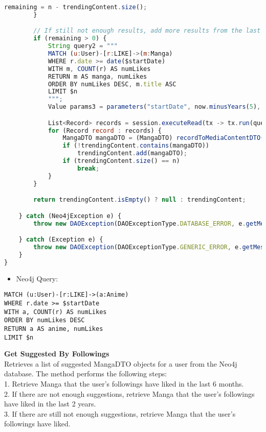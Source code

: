 \begin{lstlisting}[language=JavaScript]
            remaining = n - trendingContent.size();
        }

        // If still not enough results, add more results from the last 5 years
        if (remaining > 0) {
            String query2 = """
            MATCH (u:User)-[r:LIKE]->(m:Manga)
            WHERE r.date >= date($startDate)
            WITH m, COUNT(r) AS numLikes
            RETURN m AS manga, numLikes
            ORDER BY numLikes DESC, m.title ASC
            LIMIT $n
            """;
            Value params3 = parameters("startDate", now.minusYears(5), "n", remaining);

            List<Record> records = session.executeRead(tx -> tx.run(query2, params3).list());
            for (Record record : records) {
                MangaDTO mangaDTO = (MangaDTO) recordToMediaContentDTO(record);
                if (!trendingContent.contains(mangaDTO))
                    trendingContent.add(mangaDTO);
                if (trendingContent.size() == n)
                    break;
            }
        }

        return trendingContent.isEmpty() ? null : trendingContent;

    } catch (Neo4jException e) {
        throw new DAOException(DAOExceptionType.DATABASE_ERROR, e.getMessage());

    } catch (Exception e) {
        throw new DAOException(DAOExceptionType.GENERIC_ERROR, e.getMessage());
    }
}
\end{lstlisting}
\begin{itemize}
    \item Neo4j Query:
\end{itemize}
\begin{lstlisting}[language=Cypher]
MATCH (u:User)-[r:LIKE]->(a:Anime)
WHERE r.date >= $startDate
WITH a, COUNT(r) AS numLikes
ORDER BY numLikes DESC
RETURN a AS anime, numLikes
LIMIT $n
\end{lstlisting}
\textbf{Get Suggested By Followings}\\
Retrieves a list of suggested MangaDTO objects for a user from the Neo4j database.
The method performs the following steps:\\
1. Retrieve Manga that the user's followings have liked in the last 6 months.\\
2. If there are not enough suggestions, retrieve Manga that the user's followings have liked in the last 2 years.\\
3. If there are still not enough suggestions, retrieve Manga that the user's followings have liked.
